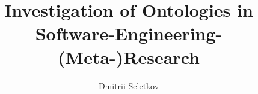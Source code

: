 \documentclass[oneside, english]{sdqseminar}
\author{Dmitrii Seletkov}
\title{Investigation of Ontologies in Software-Engineering-(Meta-)Research}
\begin{document}
\setpdf

\maketitle

 

\begin{abstract}

\end{abstract}







\printbibliography
\end{document}
